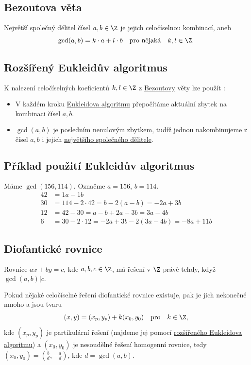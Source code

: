 \subsection{Bezoutova věta}\label{bezout}
Největší společný dělitel čísel  $a, b \in \Z$ je jejich celočíselnou kombinací, aneb
\begin{equation}
	\gcd(a,b) = k \cdot a + l \cdot b \quad \text{pro nějaká} \quad k, l \in \Z.
\end{equation}

\subsection{Rozšířený Eukleidův algoritmus}\label{rozEukleidAlgo}
K nalezení celočíselných koeficientů $k, l \in \Z$ z \hyperref[bezout]{Bezoutovy} věty lze použít :
\begin{itemize}
	\item V každém kroku \hyperref[eukleidAlgo]{Eukleidova algoritmu} přepočítáme aktuální zbytek na kombinaci čísel $a,b$.
	\item $\gcd(a,b)$ je posledním nenulovým zbytkem, tudíž jednou nakombinujeme z čísel $a,b$ i jejich \hyperref[gcd]{největšího společného dělitele}.
\end{itemize}

\subsection{Příklad použití Eukleidův algoritmus}
Máme $\gcd(156, 114)$. Označme $a = 156$, $b = 114$.
\begin{align}
	\tag{R1} 42 &= 1a - 1b \\
	\tag{R2} 30 &= 114 - 2 \cdot 42 = b - 2(a-b) = -2a + 3b \\
	\tag{R3} 12 &= 42 - 30 = a - b + 2a - 3b = 3a - 4b \\
	\tag{R4} 6 &= 30 -2 \cdot 12 = -2a + 3b -2(3a - 4b) = -8a + 11b
\end{align}

\subsection{Diofantické rovnice}\label{diofantRce}
Rovnice $ax + by = c$, kde $a,b,c \in \Z$, má řešení v $\Z$ právě tehdy, když $\gcd(a,b) | c$.

Pokud nějaké celočíselné řešení diofantické rovnice existuje, pak je jich nekonečné mnoho a jsou tvaru
\begin{equation}
	(x, y) = (x_p, y_p) + k(x_0, y_0) \quad \text{pro} \quad k \in \Z,
\end{equation}
kde $(x_p, y_p)$ je partikulární řešení (najdeme jej pomocí \hyperref[rozEukleidAlgo]{rozšířeného Eukleidova algoritmu}) a $(x_0, y_0)$ je nesoudělné řešení homogenní rovnice, tedy $(x_0, y_0) = (\frac{b}{d}, - \frac{a}{d})$, kde $d = \gcd(a,b)$.

